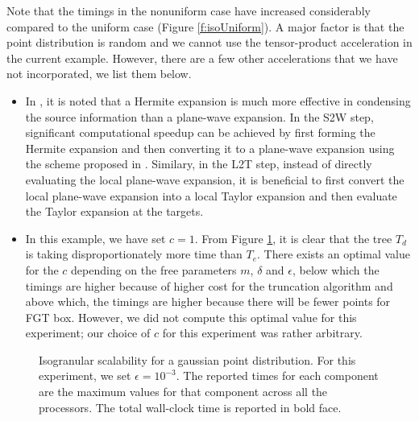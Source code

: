 Note that the timings in the nonuniform case have increased considerably compared to the uniform case (Figure \ref{f:isoUniform}). A 
major factor is that the point distribution is random and we cannot use the tensor-product acceleration in the current example. However,
 there are a few other accelerations that we have not incorporated, we list them below.
%
\begin{itemize}
  \item In \cite{fggt}, it is noted that a Hermite expansion is much more effective in condensing the source information than a plane-wave
   expansion. In the S2W step, significant computational speedup can be achieved by first forming the Hermite expansion and then converting 
   it to a plane-wave expansion using the scheme proposed in \cite{fggt}. Similary, in the L2T step, instead of directly evaluating the 
   local plane-wave expansion, it is beneficial to first convert the local plane-wave expansion into a local Taylor expansion and then evaluate 
   the Taylor expansion at the targets. 
  \item In this example, we have set $c = 1$. From Figure \ref{f:isoGaussian}, it is clear that the tree $T_d$ is taking disproportionately 
  more time than $T_e$. There exists an optimal value for the $c$ depending on the free parameters $m$, $\delta$ and $\epsilon$, below which
 the timings are higher because of higher cost for the truncation algorithm and above which, the timings are higher because
 there will be fewer points for FGT box. However, we did not compute this optimal value for this experiment; our choice of $c$ for this experiment
 was rather arbitrary.
\end{itemize}


\begin{figure}
	\begin{center}
	
	\end{center}
\caption{\label{f:isoGaussian} Isogranular scalability for a gaussian point distribution. For
 this experiment, we set $\epsilon = 10^{-3}$. The reported times for each component are the
 maximum values for that component across all the processors. The total wall-clock
time is reported in bold face.} 
\end{figure}
